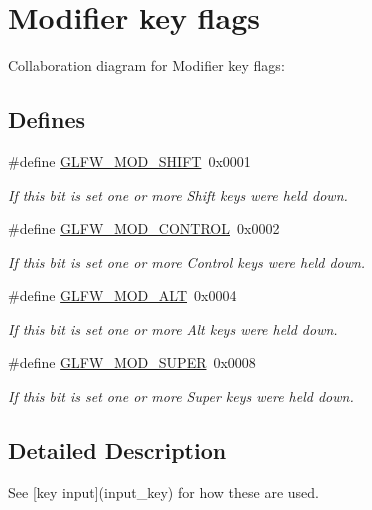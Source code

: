 \hypertarget{group__mods}{
\section{Modifier key flags}
\label{group__mods}
}


Collaboration diagram for Modifier key flags:\subsection*{Defines}
\begin{CompactItemize}
\item 
\hypertarget{group__mods_g14994d3196c290aaa347248e51740274}{
\#define \hyperlink{group__mods_g14994d3196c290aaa347248e51740274}{GLFW\_\-MOD\_\-SHIFT}~0x0001}
\label{group__mods_g14994d3196c290aaa347248e51740274}

\begin{CompactList}\small\item\em If this bit is set one or more Shift keys were held down. \item\end{CompactList}\item 
\hypertarget{group__mods_g6ed94871c3208eefd85713fa929d45aa}{
\#define \hyperlink{group__mods_g6ed94871c3208eefd85713fa929d45aa}{GLFW\_\-MOD\_\-CONTROL}~0x0002}
\label{group__mods_g6ed94871c3208eefd85713fa929d45aa}

\begin{CompactList}\small\item\em If this bit is set one or more Control keys were held down. \item\end{CompactList}\item 
\hypertarget{group__mods_gd2acd5633463c29e07008687ea73c0f4}{
\#define \hyperlink{group__mods_gd2acd5633463c29e07008687ea73c0f4}{GLFW\_\-MOD\_\-ALT}~0x0004}
\label{group__mods_gd2acd5633463c29e07008687ea73c0f4}

\begin{CompactList}\small\item\em If this bit is set one or more Alt keys were held down. \item\end{CompactList}\item 
\hypertarget{group__mods_g6b64ba10ea0227cf6f42efd0a220aba1}{
\#define \hyperlink{group__mods_g6b64ba10ea0227cf6f42efd0a220aba1}{GLFW\_\-MOD\_\-SUPER}~0x0008}
\label{group__mods_g6b64ba10ea0227cf6f42efd0a220aba1}

\begin{CompactList}\small\item\em If this bit is set one or more Super keys were held down. \item\end{CompactList}\end{CompactItemize}


\subsection{Detailed Description}
See \mbox{[}key input\mbox{]}(input\_\-key) for how these are used. 